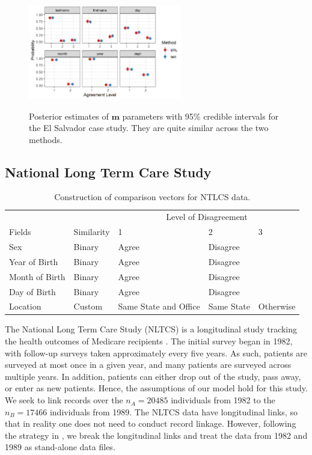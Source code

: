 \documentclass[ba]{imsart}
\begin{document}
	
	\begin{figure}[t]
		\begin{center}
			\includegraphics[width=0.6\textwidth]{../notes/figures/el_salvador/m_posterior_smallP} 
			\caption{Posterior estimates of $\bm{m}$ parameters with 95\% credible intervals for the El Salvador case study. They are quite similar across the two methods.}\label{fig:m-and-u}
			\label{fig:m-and-u}
		\end{center}
	\end{figure}
	
	\subsection{National Long Term Care Study}
	\label{nltcs}
	
	\begin{table}[t]
		\centering
		\begin{tabular}[t]{lllll}
			\multicolumn{2}{c}{ } & \multicolumn{3}{c}{Level of Disagreement} \\
			\cline{3-5}
			Fields & Similarity & 1 & 2 & 3\\
			\hline
			Sex & Binary & Agree & Disagree & \\
			Year of Birth & Binary & Agree & Disagree & \\
			Month of Birth & Binary & Agree & Disagree & \\
			Day of Birth & Binary & Agree & Disagree & \\
			Location & Custom & Same State and Office & Same State & Otherwise \\
			\hline
		\end{tabular}
		\caption{Construction of comparison vectors for NTLCS data.}\label{Tab:nltcs-comparisons}
	\end{table}
	
	The National Long Term Care Study (NLTCS) is a longitudinal study tracking the health outcomes of Medicare recipients \citep{steorts_bayesian_2016}. The initial survey began in 1982, with follow-up surveys taken approximately every five years. As such, patients are surveyed at most once in a given year, and many patients are surveyed across multiple years. In addition, patients can either drop out of the study, pass away, or enter as new patients. Hence, the assumptions of our model hold for this study. We seek to link records over the $n_A = 20485$ individuals from 1982 to the $n_B = 17466$ individuals from 1989. The NLTCS data have longitudinal links, so that in reality one does not need to conduct record linkage. However, following the strategy in \cite{guha:reiter:BA}, we break the longitudinal links and treat the data from 1982 and 1989 as stand-alone data files.
	
\end{document}
